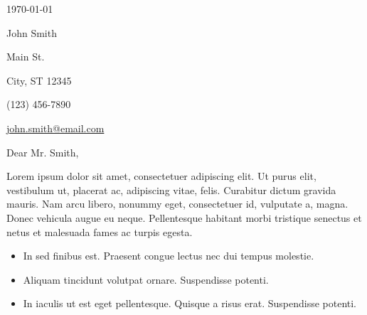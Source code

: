 \documentclass[12pt]{article}
\newcommand{\itemspace}{\vspace{0.5em}}
\begin{document}
\maketitle


\vspace{-2.8mm}
\noindent\hrulefill

\vspace{-4.5mm}
\noindent\hrulefill

\itemspace

\vspace{3em}

\noindent\monthdayyeardate\today

\vspace{3em}

\noindent John Smith

 Main St.

\noindent City, ST 12345

\noindent (123) 456-7890

\noindent \href{mailto:john.smith@email.com}{john.smith@email.com}

\vspace{3em}

\noindent Dear Mr. Smith,

\itemspace

Lorem ipsum dolor sit amet, consectetuer adipiscing elit. 
Ut purus elit, vestibulum ut, placerat ac, adipiscing vitae, felis.
Curabitur dictum gravida mauris.
Nam arcu libero, nonummy eget, consectetuer id, vulputate a, magna.
Donec vehicula augue eu neque. Pellentesque habitant morbi tristique
senectus et netus et malesuada fames ac turpis egesta.

\itemspace

\begin{itemize}[nolistsep]
    \item In sed finibus est. Praesent congue lectus nec dui tempus molestie. 
    
    \itemspace
    
    \item Aliquam tincidunt volutpat ornare. Suspendisse potenti. 
    
    \itemspace
    
    \item In iaculis ut est eget pellentesque. Quisque a risus erat. Suspendisse potenti. 
\end{itemize}
\end{document}
